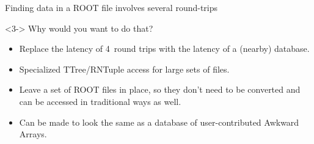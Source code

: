 \documentclass[aspectratio=169]{beamer}
\begin{document}
\begin{frame}{Finding data in a ROOT file involves several round-trips}
\vspace{1 cm}

\begin{uncoverenv}<3->
\vspace{-1.25 cm}
{\large Why would you want to do that?}

\vspace{0.25 cm}
\begin{itemize}
\item Replace the latency of 4~round trips with the latency of a (nearby) database.
\item Specialized TTree/RNTuple access for large sets of files.
\item Leave a set of ROOT files in place, so they don't need to be converted and can be accessed in traditional ways as well.
\item Can be made to look the same as a database of user-contributed Awkward Arrays.
\end{itemize}
\end{uncoverenv}
\end{frame}
\end{document}
